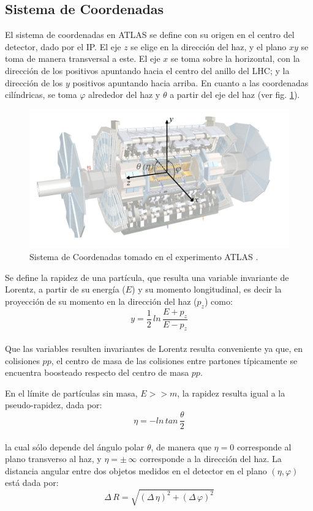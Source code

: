\subsection{Sistema de Coordenadas}

El sistema de coordenadas en ATLAS se define con su origen en el centro del detector, dado por el IP. El eje $z$ se elige en la dirección del haz, y el plano $xy$ se toma de manera transversal a este. El eje $x$ se toma sobre la horizontal, con la dirección de los positivos apuntando hacia el centro del anillo del LHC; y la dirección de los $y$ positivos apuntando hacia arriba. En cuanto a las coordenadas cilíndricas, se toma  $\varphi$ alrededor del haz y $\theta$ a partir del eje del haz (ver fig. \ref{fig:sistCoord}).

\begin{figure}[h]
    \centering
    \includegraphics[width =0.5\linewidth]{images/SistCoord}
    \caption{ Sistema de Coordenadas tomado en el experimento ATLAS \cite{OverviewATLAS}.}
    \label{fig:sistCoord}
\end{figure}


Se define la rapidez de una partícula, que resulta una variable invariante de Lorentz,  a partir de su energía ($E$) y su momento longitudinal, es decir la proyección de su momento en la dirección del haz ($p_z$) como:\\
$$ y = \frac{1}{2}\,ln\,\frac{E+p_z}{E-p_z}$$\\
Que las variables resulten invariantes de Lorentz resulta conveniente ya que, en colisiones $pp$, el centro de masa de las colisiones entre partones típicamente se encuentra boosteado respecto del centro de masa $pp$.

En el límite de partículas sin masa, $E>>m$, la rapidez resulta igual a la pseudo-rapidez, dada por: \\
$$ \eta = - ln\, tan\,\frac{\theta}{2} $$ \\
la cual sólo depende del ángulo polar $\theta$, de manera que $\eta=0$ corresponde al plano transverso al haz, y $\eta = \pm\,\infty$ corresponde a la dirección del haz. La distancia angular entre dos objetos medidos en el detector en el plano $(\eta,\varphi)$ está dada por:\\
$$ \Delta\,R=\sqrt{(\Delta\,\eta)^2 + (\Delta\,\varphi)^2} $$

